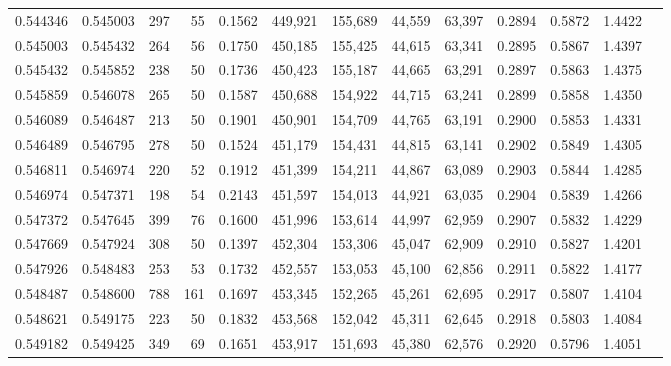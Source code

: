 \begin{tabular}{rrrrrrrrrrrrr}
0.544346 & 0.545003 &   297 &  55 &                                     0.1562 & 449,921 & 155,689 &  44,559 &  63,397 & 0.2894 & 0.5872 & 1.4422 \\
0.545003 & 0.545432 &   264 &  56 &                                     0.1750 & 450,185 & 155,425 &  44,615 &  63,341 & 0.2895 & 0.5867 & 1.4397 \\
0.545432 & 0.545852 &   238 &  50 &                                     0.1736 & 450,423 & 155,187 &  44,665 &  63,291 & 0.2897 & 0.5863 & 1.4375 \\
0.545859 & 0.546078 &   265 &  50 &                                     0.1587 & 450,688 & 154,922 &  44,715 &  63,241 & 0.2899 & 0.5858 & 1.4350 \\
0.546089 & 0.546487 &   213 &  50 &                                     0.1901 & 450,901 & 154,709 &  44,765 &  63,191 & 0.2900 & 0.5853 & 1.4331 \\
0.546489 & 0.546795 &   278 &  50 &                                     0.1524 & 451,179 & 154,431 &  44,815 &  63,141 & 0.2902 & 0.5849 & 1.4305 \\
0.546811 & 0.546974 &   220 &  52 &                                     0.1912 & 451,399 & 154,211 &  44,867 &  63,089 & 0.2903 & 0.5844 & 1.4285 \\
0.546974 & 0.547371 &   198 &  54 &                                     0.2143 & 451,597 & 154,013 &  44,921 &  63,035 & 0.2904 & 0.5839 & 1.4266 \\
0.547372 & 0.547645 &   399 &  76 &                                     0.1600 & 451,996 & 153,614 &  44,997 &  62,959 & 0.2907 & 0.5832 & 1.4229 \\
0.547669 & 0.547924 &   308 &  50 &                                     0.1397 & 452,304 & 153,306 &  45,047 &  62,909 & 0.2910 & 0.5827 & 1.4201 \\
0.547926 & 0.548483 &   253 &  53 &                                     0.1732 & 452,557 & 153,053 &  45,100 &  62,856 & 0.2911 & 0.5822 & 1.4177 \\
0.548487 & 0.548600 &   788 & 161 &                                     0.1697 & 453,345 & 152,265 &  45,261 &  62,695 & 0.2917 & 0.5807 & 1.4104 \\
0.548621 & 0.549175 &   223 &  50 &                                     0.1832 & 453,568 & 152,042 &  45,311 &  62,645 & 0.2918 & 0.5803 & 1.4084 \\
0.549182 & 0.549425 &   349 &  69 &                                     0.1651 & 453,917 & 151,693 &  45,380 &  62,576 & 0.2920 & 0.5796 & 1.4051 \\

\end{tabular}
